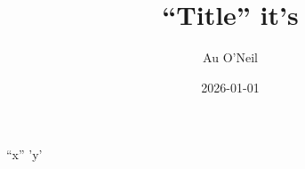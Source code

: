 \documentclass[11pt]{article}
\author{Au O'Neil}
\date{2026-01-01}
\title{``Title'' it's}
\begin{document}
\maketitle
\tableofcontents

``x'' 'y'
\end{document}
